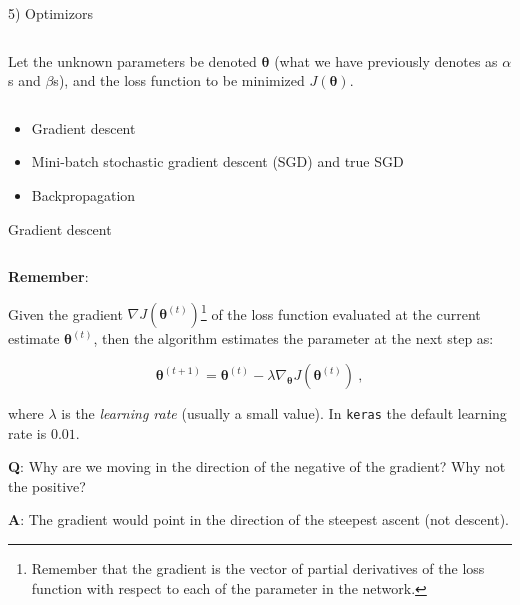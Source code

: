 \documentclass[10pt,ignorenonframetext,]{beamer}
\begin{document}
\begin{frame}

\begin{block}{5) Optimizors}

\(~\)

Let the unknown parameters be denoted \({\boldsymbol \theta}\) (what we
have previously denotes as \(\alpha\)s and \(\beta\)s), and the loss
function to be minimized \(J({\boldsymbol \theta})\).

\(~\)

\begin{itemize}
\item
  Gradient descent
\item
  Mini-batch stochastic gradient descent (SGD) and true SGD
\item
  Backpropagation
\end{itemize}

\end{block}

\end{frame}

\begin{frame}[fragile]

\begin{block}{Gradient descent}

\(~\)

\textbf{Remember}:

Given the gradient
\(\nabla J({\boldsymbol \theta}^{(t)})\)\footnote{Remember that the gradient is the vector of partial derivatives of the loss function with respect to each of the parameter in the network.}
of the loss function evaluated at the current estimate
\({\boldsymbol \theta}^{(t)}\), then the algorithm estimates the
parameter at the next step as:

\[{\boldsymbol \theta}^{(t+1)}={\boldsymbol \theta}^{(t)} - \lambda \nabla_{\boldsymbol \theta} J({\boldsymbol \theta}^{(t)}) \ , \]

where \(\lambda\) is the \emph{learning rate} (usually a small value).
In \texttt{keras} the default learning rate is \(0.01\).

\vspace{6mm}

\textbf{Q}: Why are we moving in the direction of the negative of the
gradient? Why not the positive?

\textbf{A}: The gradient would point in the direction of the steepest
ascent (not descent).

\end{block}

\end{frame}
\end{document}
